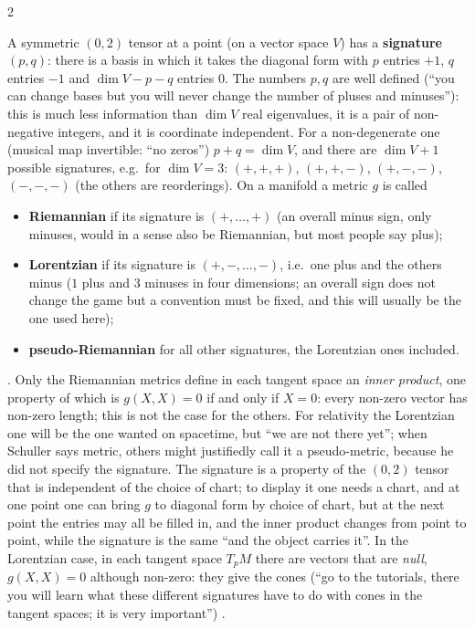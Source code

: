 \begin{paracol}{2}
\begin{definition}\label{def:c10-signature}
A symmetric $(0,2)$ tensor at a point (on a vector space $V$) has a \textbf{signature} $(p,q)$: there is a basis in which it takes the diagonal form with $p$ entries $+1$, $q$ entries $-1$ and $\dim V-p-q$ entries $0$. The numbers $p,q$ are well defined (``you can change bases but you will never change the number of pluses and minuses''): this is much less information than $\dim V$ real eigenvalues, it is a pair of non-negative integers, and it is coordinate independent. For a non-degenerate one (musical map invertible: ``no zeros'') $p+q=\dim V$, and there are $\dim V+1$ possible signatures, e.g.\ for $\dim V=3$: $(+,+,+)$, $(+,+,-)$, $(+,-,-)$, $(-,-,-)$ (the others are reorderings). On a manifold a metric $g$ is called
\begin{itemize}
  \item \textbf{Riemannian} if its signature is $(+,\dots,+)$ (an overall minus sign, only minuses, would in a sense also be Riemannian, but most people say plus);
  \item \textbf{Lorentzian} if its signature is $(+,-,\dots,-)$, i.e.\ one plus and the others minus ($1$ plus and $3$ minuses in four dimensions; an overall sign does not change the game but a convention must be fixed, and this will usually be the one used here);
  \item \textbf{pseudo-Riemannian} for all other signatures, the Lorentzian ones included.
\end{itemize}
\end{definition}
.
Only the Riemannian metrics define in each tangent space an \emph{inner product}, one property of which is $g(X,X)=0$ if and only if $X=0$: every non-zero vector has non-zero length; this is not the case for the others. For relativity the Lorentzian one will be the one wanted on spacetime, but ``we are not there yet''; when Schuller says metric, others might justifiedly call it a pseudo-metric, because he did not specify the signature. The signature is a property of the $(0,2)$ tensor that is independent of the choice of chart; to display it one needs a chart, and at one point one can bring $g$ to diagonal form by choice of chart, but at the next point the entries may all be filled in, and the inner product changes from point to point, while the signature is the same ``and the object carries it''. In the Lorentzian case, in each tangent space $T_pM$ there are vectors that are \emph{null}, $g(X,X)=0$ although non-zero: they give the cones (``go to the tutorials, there you will learn what these different signatures have to do with cones in the tangent spaces; it is very important'') .


\end{paracol}
